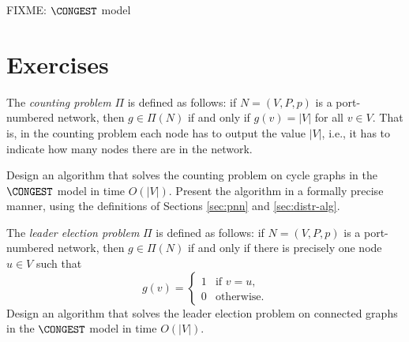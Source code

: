 
FIXME: $\CONGEST$ model

\section{Exercises}

\begin{ex}[counting]
    The \emph{counting problem} $\Pi$ is defined as follows: if $N = (V,P,p)$ is a port-numbered network, then $g \in \Pi(N)$ if and only if $g(v) = |V|$ for all $v \in V$. That is, in the counting problem each node has to output the value $|V|$, i.e., it has to indicate how many nodes there are in the network.

    Design an algorithm that solves the counting problem on cycle graphs in the $\CONGEST$ model in time $O(|V|)$. Present the algorithm in a formally precise manner, using the definitions of Sections \ref{sec:pnn} and \ref{sec:distr-alg}.
\end{ex}

\begin{ex}
    The \emph{leader election problem} $\Pi$ is defined as follows: if $N = (V,P,p)$ is a port-numbered network, then $g \in \Pi(N)$ if and only if there is precisely one node $u \in V$ such that
    \[
        g(v) = \begin{cases}
            1 & \text{if $v = u$}, \\
            0 & \text{otherwise}.
        \end{cases}
    \]
    Design an algorithm that solves the leader election problem on connected graphs in the $\CONGEST$ model in time $O(|V|)$.
\end{ex}


